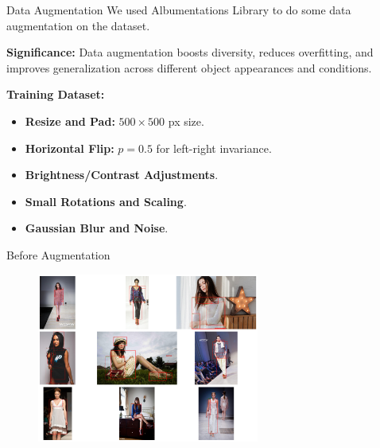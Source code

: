\begin{frame}{Data Augmentation}
\small
We used Albumentations Library to do some data augmentation on the dataset.
\begin{block}{}
  \textbf{Significance: }Data augmentation boosts diversity, reduces overfitting,
  and improves generalization across different object appearances and conditions.
\end{block}

\small
\vspace{1.25em}
\centering
\begin{minipage}{0.78\textwidth}
  \textbf{Training Dataset:}
  \vspace{-0.25em}
  \begin{itemize}
    \setlength\itemsep{-0.25em}
    \item \textbf{Resize and Pad:} $500\times500$ px size.
    \item \textbf{Horizontal Flip:} $p=0.5$ for left-right invariance.
    \item \textbf{Brightness/Contrast Adjustments}.
    \item \textbf{Small Rotations and Scaling}.
    \item \textbf{Gaussian Blur and Noise}.
  \end{itemize}
\end{minipage}

\end{frame}


\begin{frame}{Before Augmentation}

\begin{figure}[H]
    \centering
    \includegraphics[width=0.65\textwidth]{images/before_augmented.png}
\end{figure}

\end{frame}

